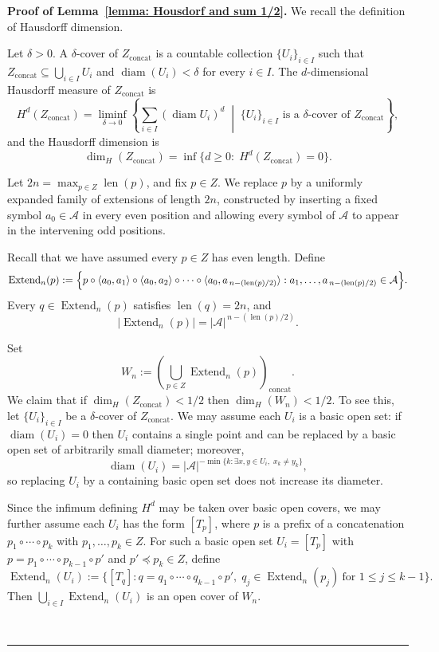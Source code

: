 \documentclass[a4,12pt]{article}%
\newenvironment{proof}[1][Proof]{\textbf{#1.} }{\ \rule{0.5em}{0.5em}}
\begin{document}
\begin{proof}[Proof of Lemma~\ref{lemma: Housdorf and sum 1/2}]
We recall the definition of Hausdorff dimension.

\smallskip

Let \(\delta>0\). A \(\delta\)-cover of \(Z_{\mathrm{concat}}\) is a countable collection \(\{U_i\}_{i\in I}\) such that \(Z_{\mathrm{concat}}\subseteq\bigcup_{i\in I}U_i\) and \(\operatorname{diam}(U_i)<\delta\) for every \(i\in I\). The \(d\)-dimensional Hausdorff measure of \(Z_{\mathrm{concat}}\) is
\[
H^d(Z_{\mathrm{concat}})
=
\liminf_{\delta\to 0}
\left\{
\sum_{i\in I}(\operatorname{diam} U_i)^d
\;\middle|\;
\{U_i\}_{i\in I}\text{ is a }\delta\text{-cover of }Z_{\mathrm{concat}}
\right\},
\]
and the Hausdorff dimension is
\[
\dim_H(Z_{\mathrm{concat}})
=
\inf\{d\ge 0:\; H^d(Z_{\mathrm{concat}})=0\}.
\]

Let \(2n=\max_{p\in Z}\operatorname{len}(p)\), and fix \(p\in Z\). We replace \(p\) by a uniformly expanded family of extensions of length \(2n\), constructed by inserting a fixed symbol \(a_0\in\mathcal A\) in every even position and allowing every symbol of \(\mathcal A\) to appear in the intervening odd positions.

Recall that we have assumed every \(p\in Z\) has even length. Define
\[
\operatorname{Extend}_n(p)
:=
\Bigl\{
p \circ \langle a_0,a_1\rangle \circ \langle a_0,a_2\rangle \circ \cdots \circ
\langle a_0,a_{\,n-(\operatorname{len}(p)/2)}\rangle
:
a_1,\dots,a_{\,n-(\operatorname{len}(p)/2)}\in\mathcal A
\Bigr\}.
\]
Every \(q\in\operatorname{Extend}_n(p)\) satisfies \(\operatorname{len}(q)=2n\), and
\[
\bigl|\operatorname{Extend}_n(p)\bigr|
=|\mathcal A|^{\,n-(\operatorname{len}(p)/2)}.
\]

Set
\[
W_n := \left( \bigcup_{p\in Z} \operatorname{Extend}_n(p)\right)_{\mathrm{concat}}.
\]
We claim that if \(\dim_H(Z_{\mathrm{concat}})<1/2\) then \(\dim_H(W_n)<1/2\). To see this, let \(\{U_i\}_{i\in I}\) be a \(\delta\)-cover of \(Z_{\mathrm{concat}}\). We may assume each \(U_i\) is a basic open set: if \(\operatorname{diam}(U_i)=0\) then \(U_i\) contains a single point and can be replaced by a basic open set of arbitrarily small diameter; moreover,
\[
\operatorname{diam}(U_i)=|\mathcal A|^{-\min\{k : \exists x,y\in U_i,\; x_k\neq y_k\}},
\]
so replacing \(U_i\) by a containing basic open set does not increase its diameter.

Since the infimum defining \(H^d\) may be taken over basic open covers, we may further assume each \(U_i\) has the form \([T_p]\), where \(p\) is a prefix of a concatenation \(p_1\circ\cdots\circ p_k\) with \(p_1,\dots,p_k\in Z\). For such a basic open set \(U_i=[T_p]\) with
\(p=p_1\circ\cdots\circ p_{k-1}\circ p'\) and \(p'\preceq p_k\in Z\), define
\[
\operatorname{Extend}_n(U_i)
:=\bigl\{[T_q]:
q=q_1\circ\cdots\circ q_{k-1}\circ p',\;
q_j\in\operatorname{Extend}_n(p_j)\ \text{for }1\le j\le k-1\bigr\}.
\]
Then \(\bigcup_{i\in I}\operatorname{Extend}_n(U_i)\) is an open cover of \(W_n\).


\end{proof}
\end{document}
